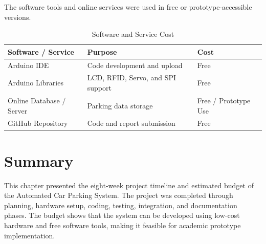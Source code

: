 The software tools and online services were used in free or prototype-accessible versions.

\begin{table}[H]
\centering
\small
\renewcommand{\arraystretch}{1.15}
\caption{Software and Service Cost}
\label{tab:software_budget}
\begin{tabular}{|p{}|p{}|p{}|}
\hline
\textbf{Software / Service} & \textbf{Purpose} & \textbf{Cost} \\
\hline
Arduino IDE & Code development and upload & Free \\
\hline
Arduino Libraries & LCD, RFID, Servo, and SPI support & Free \\
\hline
Online Database / Server & Parking data storage & Free / Prototype Use \\
\hline
GitHub Repository & Code and report submission & Free \\
\hline
\end{tabular}
\normalsize
\end{table}

\section{Summary}

This chapter presented the eight-week project timeline and estimated budget of the Automated Car Parking System. The project was completed through planning, hardware setup, coding, testing, integration, and documentation phases. The budget shows that the system can be developed using low-cost hardware and free software tools, making it feasible for academic prototype implementation.

